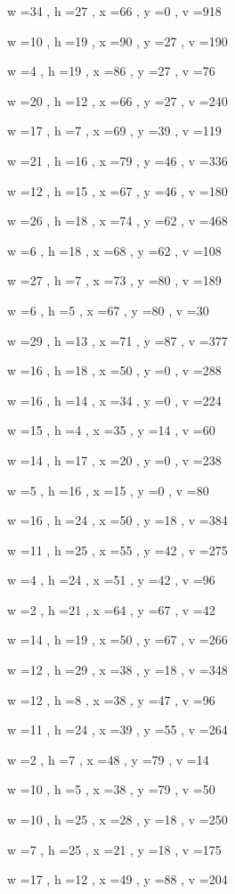 \documentclass[11pt]{article}
\begin{document}
w =34 , h =27 , x =66 , y =0 , v =918
\par
w =10 , h =19 , x =90 , y =27 , v =190
\par
w =4 , h =19 , x =86 , y =27 , v =76
\par
w =20 , h =12 , x =66 , y =27 , v =240
\par
w =17 , h =7 , x =69 , y =39 , v =119
\par
w =21 , h =16 , x =79 , y =46 , v =336
\par
w =12 , h =15 , x =67 , y =46 , v =180
\par
w =26 , h =18 , x =74 , y =62 , v =468
\par
w =6 , h =18 , x =68 , y =62 , v =108
\par
w =27 , h =7 , x =73 , y =80 , v =189
\par
w =6 , h =5 , x =67 , y =80 , v =30
\par
w =29 , h =13 , x =71 , y =87 , v =377
\par
w =16 , h =18 , x =50 , y =0 , v =288
\par
w =16 , h =14 , x =34 , y =0 , v =224
\par
w =15 , h =4 , x =35 , y =14 , v =60
\par
w =14 , h =17 , x =20 , y =0 , v =238
\par
w =5 , h =16 , x =15 , y =0 , v =80
\par
w =16 , h =24 , x =50 , y =18 , v =384
\par
w =11 , h =25 , x =55 , y =42 , v =275
\par
w =4 , h =24 , x =51 , y =42 , v =96
\par
w =2 , h =21 , x =64 , y =67 , v =42
\par
w =14 , h =19 , x =50 , y =67 , v =266
\par
w =12 , h =29 , x =38 , y =18 , v =348
\par
w =12 , h =8 , x =38 , y =47 , v =96
\par
w =11 , h =24 , x =39 , y =55 , v =264
\par
w =2 , h =7 , x =48 , y =79 , v =14
\par
w =10 , h =5 , x =38 , y =79 , v =50
\par
w =10 , h =25 , x =28 , y =18 , v =250
\par
w =7 , h =25 , x =21 , y =18 , v =175
\par
w =17 , h =12 , x =49 , y =88 , v =204
\par
\newpage
\end{document}
